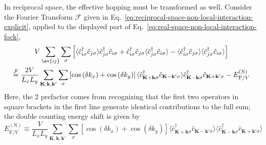 In reciprocal space, the effective hopping must be transformed as well. Consider the Fourier Transform $\mathcal{F}$ given in Eq.~\eqref{eq:reciprocal-space-non-local-interaction-explicit}, applied to the displayed part of Eq.~\eqref{eq:real-space-non-local-interaction-fock},
\begin{multline}
	V \sum_{\ev{ij}} \sum_\sigma \left[
		\langle
		\hat c_{i\sigma}^\dagger \hat c_{j\sigma}
		\rangle \hat c_{j\sigma}^\dagger  \hat c_{i\sigma} + 
		\hat c_{i\sigma}^\dagger \hat c_{j\sigma}
		\langle \hat c_{j\sigma}^\dagger  \hat c_{i\sigma} \rangle - \langle \hat c_{i\sigma}^\dagger \hat c_{j\sigma}
		\rangle \langle \hat c_{j\sigma}^\dagger  \hat c_{i\sigma} \rangle
	\right] \\
	\stackrel{\mathcal{F}}{=} \frac{2V}{L_x L_y} \sum_{\mathbf{K}, \mathbf{k}, \mathbf{k}'} \sum_\sigma \left[
	\cos \left(
	\delta k_x
	\right)	+ \cos \left(
	\delta k_y
	\right)	
	\right]	
	\langle
	\hat c_{\mathbf{K}+\mathbf{k} \sigma}^\dagger 
	\hat c_{\mathbf{K}-\mathbf{k}' \sigma}
	\rangle
	\hat c_{\mathbf{K}-\mathbf{k} \sigma}^\dagger  \hat c_{\mathbf{K}+\mathbf{k}'\sigma} - E_{\mathrm{F}/V}^{(\mathrm{N})} \label{eq:normal-V-fock-int1}
\end{multline}
Here, the $2$ prefactor comes from recognizing that the first two operators in square brackets in the first line generate identical contributions to the full sum; the double counting energy shift is given by
\begin{equation}\label{eq:reciprocal-space-non-local-interaction-fock-double-couting}
	E_{\mathrm{F}/V}^{(\mathrm{N})} \equiv \frac{V}{L_x L_y} \sum_{\mathbf{K}, \mathbf{k}, \mathbf{k}'} \sum_\sigma \left[
		\cos \left(
			\delta k_x
		\right)	+ \cos \left(
			\delta k_y
		\right)	
	\right]	
	\langle
		\hat c_{\mathbf{K}+\mathbf{k} \sigma}^\dagger 
	\hat c_{\mathbf{K}-\mathbf{k}' \sigma}
	\rangle \langle
		\hat c_{\mathbf{K}-\mathbf{k} \sigma}^\dagger  \hat c_{\mathbf{K}+\mathbf{k}'\sigma} 
	\rangle
\end{equation}

